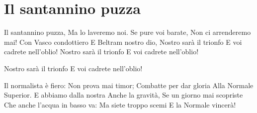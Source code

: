 \section{Il santannino puzza}
\subtitle{Sulla melodia della “Virginia Company”}
\begin{canzone}
Il santannino puzza,
Ma lo laveremo noi.
Se pure voi barate,
Non ci arrenderemo mai!
Con Vasco condottiero
E Beltram nostro dio,
Nostro sarà il trionfo
E voi cadrete nell’oblio!
Nostro sarà il trionfo
E voi cadrete nell’oblio!

Nostro sarà il trionfo
E voi cadrete nell’oblio!

Il normalista è fiero:
Non prova mai timor;
Combatte per dar gloria
Alla Normale Superior.
E abbiamo dalla nostra
Anche la gravità,
Se un giorno mai scopriste
Che anche l’acqua in basso va:
Ma siete troppo scemi
E la Normale vincerà!
\end{canzone}
